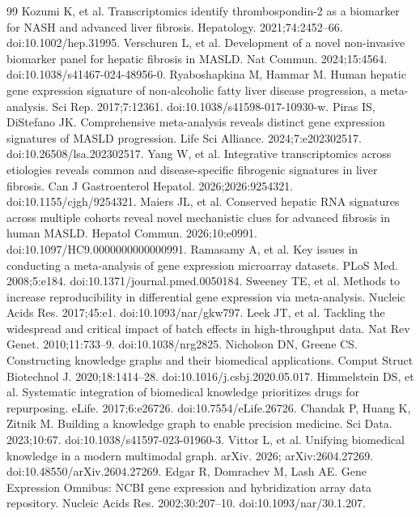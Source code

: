 \documentclass[11pt,a4paper]{article}
\begin{document}
{\begin{thebibliography}{99}
 Kozumi K, et al. Transcriptomics identify thrombospondin-2 as a biomarker for NASH and advanced liver fibrosis. Hepatology. 2021;74:2452--66. doi:10.1002/hep.31995.
 Verschuren L, et al. Development of a novel non-invasive biomarker panel for hepatic fibrosis in MASLD. Nat Commun. 2024;15:4564. doi:10.1038/s41467-024-48956-0.
 Ryaboshapkina M, Hammar M. Human hepatic gene expression signature of non-alcoholic fatty liver disease progression, a meta-analysis. Sci Rep. 2017;7:12361. doi:10.1038/s41598-017-10930-w.
 Piras IS, DiStefano JK. Comprehensive meta-analysis reveals distinct gene expression signatures of MASLD progression. Life Sci Alliance. 2024;7:e202302517. doi:10.26508/lsa.202302517.
 Yang W, et al. Integrative transcriptomics across etiologies reveals common and disease-specific fibrogenic signatures in liver fibrosis. Can J Gastroenterol Hepatol. 2026;2026:9254321. doi:10.1155/cjgh/9254321.
 Maiers JL, et al. Conserved hepatic RNA signatures across multiple cohorts reveal novel mechanistic clues for advanced fibrosis in human MASLD. Hepatol Commun. 2026;10:e0991. doi:10.1097/HC9.0000000000000991.
 Ramasamy A, et al. Key issues in conducting a meta-analysis of gene expression microarray datasets. PLoS Med. 2008;5:e184. doi:10.1371/journal.pmed.0050184.
 Sweeney TE, et al. Methods to increase reproducibility in differential gene expression via meta-analysis. Nucleic Acids Res. 2017;45:e1. doi:10.1093/nar/gkw797.
 Leek JT, et al. Tackling the widespread and critical impact of batch effects in high-throughput data. Nat Rev Genet. 2010;11:733--9. doi:10.1038/nrg2825.
 Nicholson DN, Greene CS. Constructing knowledge graphs and their biomedical applications. Comput Struct Biotechnol J. 2020;18:1414--28. doi:10.1016/j.csbj.2020.05.017.
 Himmelstein DS, et al. Systematic integration of biomedical knowledge prioritizes drugs for repurposing. eLife. 2017;6:e26726. doi:10.7554/eLife.26726.
 Chandak P, Huang K, Zitnik M. Building a knowledge graph to enable precision medicine. Sci Data. 2023;10:67. doi:10.1038/s41597-023-01960-3.
 Vittor L, et al. Unifying biomedical knowledge in a modern multimodal graph. arXiv. 2026; arXiv:2604.27269. doi:10.48550/arXiv.2604.27269.
 Edgar R, Domrachev M, Lash AE. Gene Expression Omnibus: NCBI gene expression and hybridization array data repository. Nucleic Acids Res. 2002;30:207--10. doi:10.1093/nar/30.1.207.

\end{thebibliography}}
\end{document}

